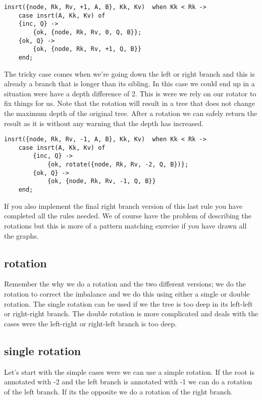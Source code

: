 \documentclass[a4paper,11pt]{article}
\begin{document}
\begin{lstlisting}
insrt({node, Rk, Rv, +1, A, B}, Kk, Kv)  when Kk < Rk ->
    case insrt(A, Kk, Kv) of
	{inc, Q} ->
	    {ok, {node, Rk, Rv, 0, Q, B}};
	{ok, Q} ->
	    {ok, {node, Rk, Rv, +1, Q, B}}
    end;
\end{lstlisting}

The tricky case comes when we're going down the left or right branch
and this is already a branch that is longer than its sibling. In this
case we could end up in a situation were have a depth difference of
2. This is were we rely on our rotator to fix things for us. Note that
the rotation will result in a tree that does not change the maximum
depth of the original tree. After a rotation we can safely return the
result as it is without any warning that the depth has increased.

\begin{lstlisting}
insrt({node, Rk, Rv, -1, A, B}, Kk, Kv)  when Kk < Rk ->
    case insrt(A, Kk, Kv) of
        {inc, Q} ->
            {ok, rotate({node, Rk, Rv, -2, Q, B})};
        {ok, Q} ->
            {ok, {node, Rk, Rv, -1, Q, B}}
    end;
\end{lstlisting}

If you also implement the final right branch version of this last rule
you have completed all the rules needed. We of course have the problem
of describing the rotations but this is more of a pattern matching
exercise if you have drawn all the graphs.

\subsection{rotation}

Remember the why we do a rotation and the two different versions; we
do the rotation to correct the imbalance and we do this using either a
single or double rotation. The single rotation can be used if we the
tree is too deep in its left-left or right-right branch. The double
rotation is more complicated and deals with the cases were the
left-right or right-left branch is too deep.

\subsection{single rotation}

Let's start with the simple cases were we can use a simple
rotation. If the root is annotated with -2 and the left branch is
annotated with -1 we can do a rotation of the left branch. If its the
opposite we do a rotation of the right branch.
\end{document}
